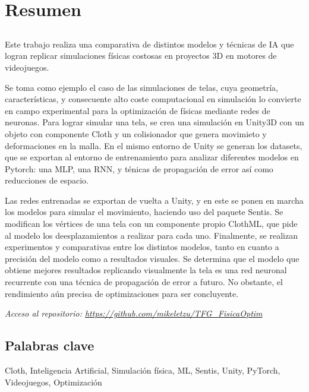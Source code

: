 \chapter*{Resumen}

\section*{\tituloPortadaVal}
Este trabajo realiza una comparativa de distintos modelos y técnicas de IA que logran replicar simulaciones físicas costosas en proyectos 3D en motores de videojuegos. \newline

Se toma como ejemplo el caso de las simulaciones de telas, cuya geometría, características, y consecuente alto coste computacional en simulación lo convierte en campo experimental para la optimización de físicas mediante redes de neuronas. Para lograr simular una tela, se crea una simulación en Unity3D con un objeto con componente Cloth y un colisionador que genera movimieto y deformaciones en la malla. En el mismo entorno de Unity se generan los datasets, que se exportan al entorno de entrenamiento para analizar diferentes modelos en Pytorch: una MLP, una RNN, y ténicas de propagación de error así como reducciones de espacio.

Las redes entrenadas se exportan de vuelta a Unity, y en este se ponen en marcha los modelos para simular el movimiento, haciendo uso del paquete Sentis. Se modifican los vértices de una tela con un componente propio ClothML, que pide al modelo los deesplazamientos a realizar para cada uno. Finalmente, se realizan experimentos y comparativas entre los distintos modelos, tanto en cuanto a precisión del modelo como a resultados visuales. Se determina que el modelo que obtiene mejores resultados replicando visualmente la tela es una red neuronal recurrente con una técnica de propagación de error a futuro. No obstante, el rendimiento aún precisa de optimizaciones para ser concluyente. \newline

\textit{Acceso al repositorio: \url{https://github.com/mikeletzu/TFG_FisicaOptim}}

\section*{Palabras clave}

\noindent Cloth, Inteligencia Artificial, Simulación física, ML, Sentis, Unity, PyTorch, Videojuegos, Optimización




